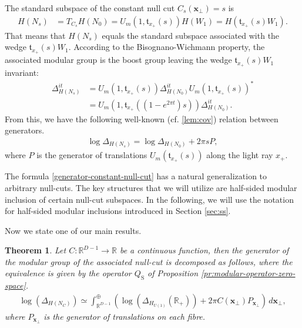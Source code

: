 \documentclass[12pt]{article}
\def\RR{{\mathbb R}}
\def\tx{\pmb{x}}
\newtheorem{theorem}{Theorem}[section]
\theoremstyle{remark}
\begin{document}
The standard subspace of the constant null cut $C_s(\tx_\perp)=s$ is
  \begin{align*}
   H(N_{s})&=T_{C_s}H(N_0)
   =U_m(1, \mathfrak{t}_{x_+}(s))H(W_1)
   =H(\mathfrak{t}_{x_+}(s)W_1).
  \end{align*}
 That means that $H(N_s)$ equals the standard subspace associated with the wedge $\mathfrak{t}_{x_+}(s)W_1$. According to the Bisognano-Wichmann property, the associated modular group is the boost group leaving the wedge $\mathfrak{t}_{x_+}(s)W_1$ invariant:
  \begin{align*}
   \Delta_{H(N_s)}^{it}&= U_m(1,\mathfrak{t}_{x_+}(s))\Delta_{H(N_0)}^{it}U_m(1,\mathfrak{t}_{x_+}(s))^*\\
   &=U_m(1,\mathfrak{t}_{x_+}((1-e^{2\pi t})s))\Delta_{H(N_0)}^{it}.
  \end{align*}
  From this, we have the following well-known (cf.\! \autoref{lem:cov}) relation between generators.
    \begin{align}\label{generator-constant-null-cut}
     \log{\Delta_{H(N_s)}}=\log{\Delta_{H(N_0)}}+2\pi sP,
    \end{align}
   where $P$ is the generator of translations $U_m(\mathfrak{t}_{x_+}(s))$ along the light ray $x_+$.
 
 The formula \eqref{generator-constant-null-cut} has a natural generalization to arbitrary null-cuts.
 The key structures that we will utilize are half-sided modular inclusion of certain null-cut subspaces. In the following, we will use the notation for half-sided modular inclusions introduced in Section \ref{sec:ss}.
 

 
Now we state one of our main results.
\begin{theorem}\label{main-thm}
 Let $C:\RR^{D-1}\rightarrow\RR$ be a continuous function, then the generator of the modular group of the associated null-cut is
    decomposed as follows, where the equivalence is given by the operator $Q_{\mathrm S}$ of Proposition \ref{pr:modular-operator-zero-space}.
    \begin{align}\label{null-cut-modular-spatial-decom}
     \log(\Delta_{H(N_C)})\simeq \int^\oplus_{\RR^{D-1}}\left( \log(\Delta_{H_{U(1)}}(\RR_+))+ 2\pi C(\pmb{x}_\perp) P_{\pmb{x}_\perp}\right)\,d\pmb{x}_\perp,
    \end{align}
   where $P_{\pmb{x}_\perp}$ is the generator of translations on each fibre.
\end{theorem}
  
\end{document}
